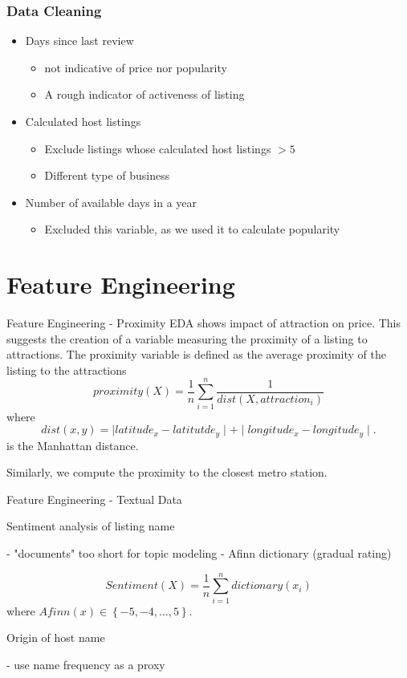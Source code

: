 \documentclass{beamer}
\begin{document}
\begin{frame}

    \frametitle{Data Cleaning}
    \begin{itemize}
        \item Days since last review
        \begin{itemize}
            \item not indicative of price nor popularity
            \item A rough indicator of activeness of listing
        \end{itemize}
        \item Calculated host listings
        \begin{itemize}
            \item Exclude listings whose calculated host listings $>5$
            \item Different type of business
        \end{itemize}
        \item Number of available days in a year
        \begin{itemize}
            \item Excluded this variable, as we used it to calculate popularity
        \end{itemize}
    \end{itemize}

\end{frame}

\section{Feature Engineering}
\begin{frame}{Feature Engineering - Proximity}
EDA shows impact of attraction on price. This suggests the creation of a variable measuring the proximity of a listing to attractions. The proximity variable is defined as the average proximity of the listing to the attractions
$$proximity(X) = \dfrac{1}{n}\sum_{i=1}^{n} \dfrac{1}{dist(X, attraction_i)}
$$
where
$$ 
dist(x, y) = \mid latitude_{x} - latitutde_{y} \mid +  \mid longitude_{x} - longitude_{y} \mid.
$$
is the Manhattan distance.

Similarly, we compute the proximity to the closest metro station.
\end{frame}

\begin{frame}{Feature Engineering - Textual Data}

Sentiment analysis of listing name

- "documents" too short for topic modeling
- Afinn dictionary (gradual rating)

$$ Sentiment(X) = \dfrac{1}{n}\sum_{i=1}^{n} dictionary(x_i)
$$
where $Afinn(x) \in \left\lbrace -5, -4, \dots, 5\right\rbrace $.

Origin of host name 

- use name frequency as a proxy

\end{frame}
\end{document}
